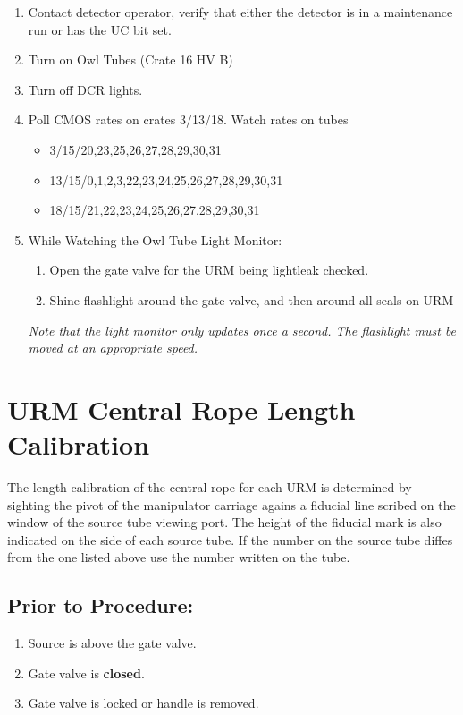 \begin{enumerate}
\item \CheckBox[name=ulc1]{} Contact detector operator, verify that either the detector
  is in a maintenance run or has the UC bit set.
\item \CheckBox[name=ulc2]{} Turn on Owl Tubes (Crate 16 HV B)
\item \CheckBox[name=ulc3]{} Turn off DCR lights.
\item \CheckBox[name=ulc4]{} Poll CMOS rates on crates 3/13/18. Watch rates on tubes 
\begin{itemize}
\item 3/15/20,23,25,26,27,28,29,30,31
\item 13/15/0,1,2,3,22,23,24,25,26,27,28,29,30,31
\item 18/15/21,22,23,24,25,26,27,28,29,30,31
\end{itemize}
\item \CheckBox[name=ulc5]{} While Watching the Owl Tube Light Monitor:
  \begin{enumerate}
  \item Open the gate valve for the URM being lightleak checked.
  \item Shine flashlight around the gate valve, 
         and then around all seals on URM
  \end{enumerate}
  \small
  {\em
    Note that the light monitor only updates once a second.  The
    flashlight must be moved at an appropriate speed.
  }
  \normalsize
\end{enumerate}

\section{URM Central Rope Length Calibration}

The length calibration of the central rope for each URM is determined by sighting the pivot of the manipulator carriage agains a fiducial line scribed on the window of the source tube viewing port. The height of the fiducial mark is also indicated on the side of each source tube. If the number on the source tube diffes from the one listed above use the number written on the tube.

\subsection{Prior to Procedure:}
\begin{enumerate}
\item Source is above the gate valve.
\item Gate valve is {\bf closed}.
\item Gate valve is locked or handle is removed.
\end{enumerate}
